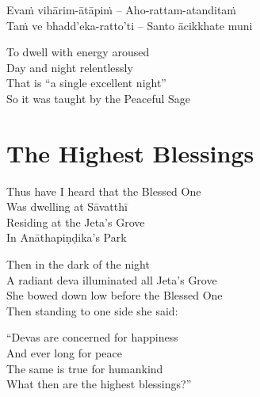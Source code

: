 \begin{twochants}
  Evaṁ vihārim-ātāpiṁ – Aho-rattam-atanditaṁ\\
  Taṁ ve bhadd’eka-ratto’ti – Santo ācikkhate muni\\
\end{twochants}

\begin{english}
  To dwell with energy aroused\\
  Day and night relentlessly\\
  That is ``a single excellent night''\\
  So it was taught by the Peaceful Sage
\end{english}

\suttaRef{[MN 131]}


\section{The Highest Blessings}
\label{highest-blessings}

\begin{leader}
\end{leader}

Thus have I heard that the Blessed One\\
Was dwelling at Sāvatthī\\
Residing at the Jeta’s Grove\\
In Anāthapiṇḍika’s Park

\bigskip

Then in the dark of the night\\
A radiant deva illuminated all Jeta’s Grove\\
She bowed down low before the Blessed One\\
Then standing to one side she said:

\bigskip

``Devas are concerned for happiness\\
And ever long for peace\\
The same is true for humankind\\
What then are the highest blessings?''

